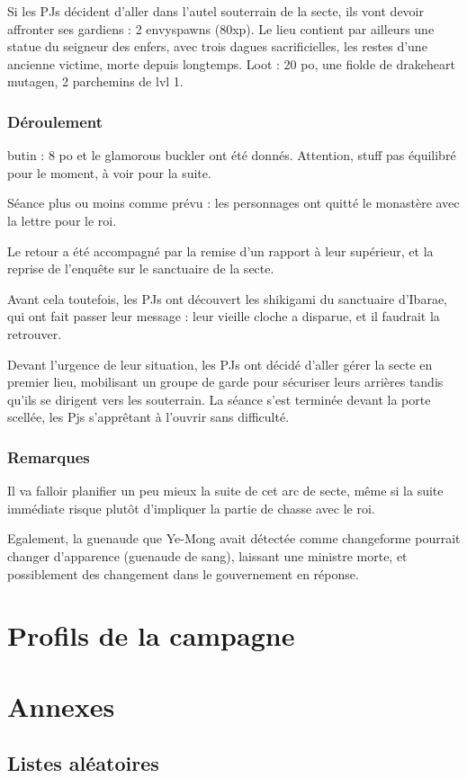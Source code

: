 \documentclass[10pt,a4paper]{book}
\begin{document}
Si les PJs décident d'aller dans l'autel souterrain de la secte, ils vont devoir affronter ses gardiens : 2 envyspawns (80xp). Le lieu contient par ailleurs une statue du seigneur des enfers, avec trois dagues sacrificielles, les restes d'une ancienne victime, morte depuis longtemps. Loot : 20 po, une fiolde de drakeheart mutagen, 2 parchemins de lvl 1.


\subsection{Déroulement}
butin : 8 po et le glamorous buckler ont été donnés. Attention, stuff pas équilibré pour le moment, à voir pour la suite.

Séance plus ou moins comme prévu : les personnages ont quitté le monastère avec la lettre pour le roi. 

Le retour a été accompagné par la remise d'un rapport à leur supérieur, et la reprise de l'enquête sur le sanctuaire de la secte.

Avant cela toutefois, les PJs ont découvert les shikigami du sanctuaire d'Ibarae, qui ont fait passer leur message : leur vieille cloche a disparue, et il faudrait la retrouver.

Devant l'urgence de leur situation, les PJs ont décidé d'aller gérer la secte en premier lieu, mobilisant un groupe de garde pour sécuriser leurs arrières tandis qu'ils se dirigent vers les souterrain. La séance s'est terminée devant la porte scellée, les Pjs s'apprêtant à l'ouvrir sans difficulté.
\subsection{Remarques}
Il va falloir planifier un peu mieux la suite de cet arc de secte, même si la suite immédiate risque plutôt d'impliquer la partie de chasse avec le roi.

Egalement, la guenaude que Ye-Mong avait détectée comme changeforme pourrait changer d'apparence (guenaude de sang), laissant une ministre morte, et possiblement des changement dans le gouvernement en réponse.
\chapter{Profils de la campagne}
\chapter*{Annexes}
\section*{Listes aléatoires}
\end{document}
